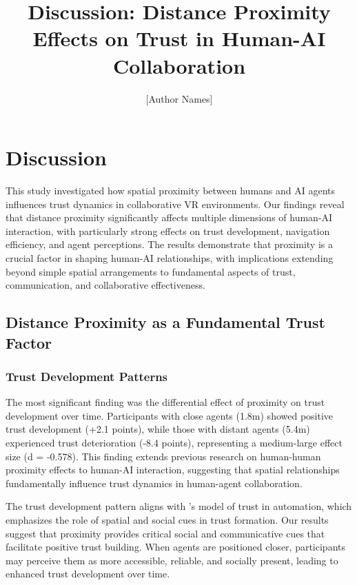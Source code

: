\documentclass[12pt]{article}
\title{\textbf{Discussion: Distance Proximity Effects on Trust in Human-AI Collaboration}}
\author{[Author Names]}
\date{}
\begin{document}
\maketitle

\section{Discussion}

This study investigated how spatial proximity between humans and AI agents influences trust dynamics in collaborative VR environments. Our findings reveal that distance proximity significantly affects multiple dimensions of human-AI interaction, with particularly strong effects on trust development, navigation efficiency, and agent perceptions. The results demonstrate that proximity is a crucial factor in shaping human-AI relationships, with implications extending beyond simple spatial arrangements to fundamental aspects of trust, communication, and collaborative effectiveness.

\subsection{Distance Proximity as a Fundamental Trust Factor}

\subsubsection{Trust Development Patterns}

The most significant finding was the differential effect of proximity on trust development over time. Participants with close agents (1.8m) showed positive trust development (+2.1 points), while those with distant agents (5.4m) experienced trust deterioration (-8.4 points), representing a medium-large effect size (d = -0.578). This finding extends previous research on human-human proximity effects \citep{hall1966hidden} to human-AI interaction, suggesting that spatial relationships fundamentally influence trust dynamics in human-agent collaboration.

The trust development pattern aligns with \citeauthor{lee2004trust}'s \citeyear{lee2004trust} model of trust in automation, which emphasizes the role of spatial and social cues in trust formation. Our results suggest that proximity provides critical social and communicative cues that facilitate positive trust building. When agents are positioned closer, participants may perceive them as more accessible, reliable, and socially present, leading to enhanced trust development over time.
\end{document}
